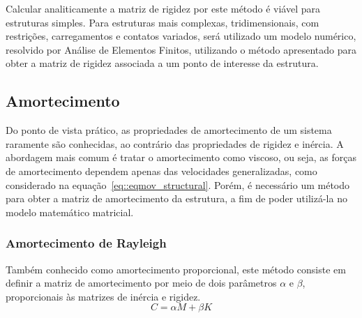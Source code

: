 Calcular analiticamente a matriz de rigidez por este método é viável para
estruturas simples. Para estruturas mais complexas, tridimensionais, com
restrições, carregamentos e contatos variados, será utilizado um modelo
numérico, resolvido por Análise de Elementos Finitos, utilizando o método
apresentado para obter a matriz de rigidez associada a um ponto de interesse da
estrutura.


\subsection{Amortecimento} \label{sec::amortecimento}

Do ponto de vista prático, as propriedades de amortecimento de um sistema
raramente são conhecidas, ao contrário das propriedades de rigidez e inércia.
A abordagem mais comum é tratar o amortecimento como viscoso, ou seja, as forças
de amortecimento dependem apenas das velocidades generalizadas, como considerado
na equação~\ref{eq::eqmov_structural}.
Porém, é necessário um método para obter a matriz de amortecimento da estrutura,
a fim de poder utilizá-la no modelo matemático matricial.

\subsubsection{Amortecimento de Rayleigh} \label{sec::amortecimento_revbib}

Também conhecido como amortecimento proporcional, este método consiste em
definir a matriz de amortecimento por meio de dois parâmetros $\alpha$ e
$\beta$, proporcionais às matrizes de inércia e rigidez. 
%
\begin{equation}
	C = \alpha M + \beta K	
\end{equation}
%

